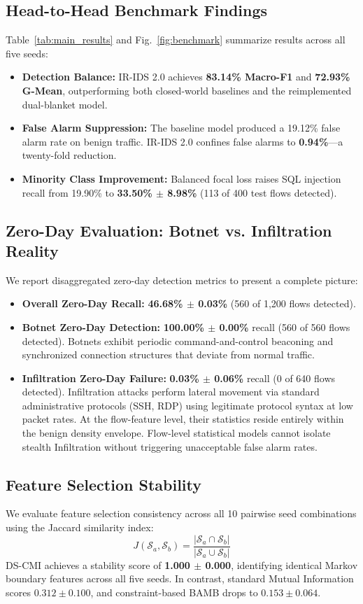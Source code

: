\documentclass[10pt,journal,compsoc]{IEEEtran}
\begin{document}
\subsection{Head-to-Head Benchmark Findings}
Table~\ref{tab:main_results} and Fig.~\ref{fig:benchmark} summarize results across all five seeds:
\begin{itemize}
    \item \textbf{Detection Balance:} IR-IDS 2.0 achieves \textbf{83.14\% Macro-F1} and \textbf{72.93\% G-Mean}, outperforming both closed-world baselines and the reimplemented dual-blanket model.
    \item \textbf{False Alarm Suppression:} The baseline model produced a 19.12\% false alarm rate on benign traffic. IR-IDS 2.0 confines false alarms to \textbf{0.94\%}—a twenty-fold reduction.
    \item \textbf{Minority Class Improvement:} Balanced focal loss raises SQL injection recall from 19.90\% to \textbf{33.50\% $\pm$ 8.98\%} (113 of 400 test flows detected).
\end{itemize}

\subsection{Zero-Day Evaluation: Botnet vs. Infiltration Reality}
We report disaggregated zero-day detection metrics to present a complete picture:
\begin{itemize}
    \item \textbf{Overall Zero-Day Recall:} \textbf{46.68\% $\pm$ 0.03\%} (560 of 1,200 flows detected).
    \item \textbf{Botnet Zero-Day Detection:} \textbf{100.00\% $\pm$ 0.00\%} recall (560 of 560 flows detected). Botnets exhibit periodic command-and-control beaconing and synchronized connection structures that deviate from normal traffic.
    \item \textbf{Infiltration Zero-Day Failure:} \textbf{0.03\% $\pm$ 0.06\%} recall (0 of 640 flows detected). Infiltration attacks perform lateral movement via standard administrative protocols (SSH, RDP) using legitimate protocol syntax at low packet rates. At the flow-feature level, their statistics reside entirely within the benign density envelope. Flow-level statistical models cannot isolate stealth Infiltration without triggering unacceptable false alarm rates.
\end{itemize}

\subsection{Feature Selection Stability}
We evaluate feature selection consistency across all 10 pairwise seed combinations using the Jaccard similarity index:
\begin{equation}
J(\mathcal{S}_a, \mathcal{S}_b) = \frac{|\mathcal{S}_a \cap \mathcal{S}_b|}{|\mathcal{S}_a \cup \mathcal{S}_b|}
\end{equation}
DS-CMI achieves a stability score of \textbf{1.000 $\pm$ 0.000}, identifying identical Markov boundary features across all five seeds. In contrast, standard Mutual Information scores $0.312 \pm 0.100$, and constraint-based BAMB drops to $0.153 \pm 0.064$.
\end{document}
